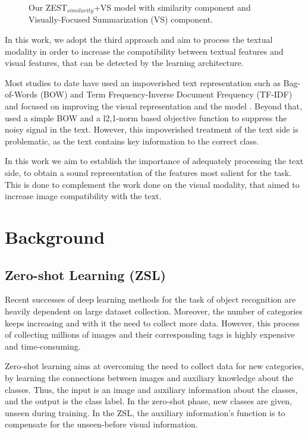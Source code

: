 \documentclass[11pt,a4paper]{article}
\begin{document}
\begin{figure}[t]
\centering
{}
 \caption{Our ZEST$_{similarity}$+VS model with similarity component and Visually-Focused Summarization (VS) component.}
\label{fig:data}
\end{figure}

In this work, we adopt the third approach and aim to process the textual modality in order to increase the compatibility between textual features and visual features, that can be detected by the learning architecture.
\par

Most studies to date have used an impoverished text representation such as Bag-of-Words (BOW) and Term Frequency-Inverse Document Frequency (TF-IDF) and focused on improving the visual representation and the model \cite{lei2015predicting,elhoseiny2013write,elhoseiny2016write,elhoseiny2017link,zhu2018generative}. Beyond that, \citet{qiao2016less} used a simple BOW and a l2,1-norm based objective function to suppress the noisy signal in the text. However, this impoverished treatment of the text side is problematic, as the text contains key information to the correct class. 

In this work we aim to establish the importance of adequately processing the text side, to obtain a sound representation of the features most salient for the task. This is done to complement the work done on the visual modality, that aimed to increase image compatibility with the text.

\section{Background}
\subsection{Zero-shot Learning (ZSL)}

Recent successes of deep learning methods for the task of object recognition are heavily dependent on large dataset collection.
Moreover, the number of categories keeps increasing and with it the need to collect more data. However, this process of collecting millions of images and their corresponding tags is highly expensive and time-consuming. \par

Zero-shot learning aims at overcoming the need to collect data for new categories, by learning the connections between images and auxiliary knowledge about the classes. Thus, the input is an image and auxiliary information about the classes, and the output is the class label. In the zero-shot phase, new classes are given, unseen during training. In the ZSL, the auxiliary information's function is to compensate for the unseen-before visual information.
\par
\end{document}
